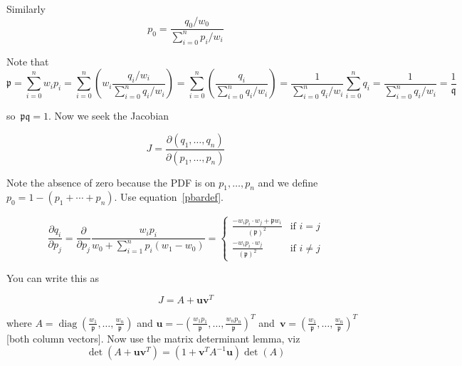 \documentclass[nojss]{jss}
\DeclareMathOperator{\diag}{diag}
\newcommand{\sztn}{\sum_{i=0}^{n}}
\newcommand{\sotn}{\sum_{i=1}^{n}}
\begin{document}
Similarly
\begin{equation}
  p_0=\frac{q_0/w_0}{\sztn p_i/w_i}
  \end{equation}

Note that 
\begin{equation}
  \mathfrak{p} =  \sum_{i=0}^{n}w_ip_i
  =\sum_{i=0}^{n}\left(w_i\frac{q_i/w_i}{\sum_{i=0}^nq_i/w_i}\right)
  =\sum_{i=0}^{n}\left(\frac{q_i}{\sum_{i=0}^nq_i/w_i}\right)
  =\frac{1}{\sum_{i=0}^nq_i/w_i}\sum_{i=0}^{n}q_i
  =\frac{1}{\sum_{i=0}^nq_i/w_i}
  =\frac{1}{\mathfrak q}
  \end{equation}

so~${\mathfrak p}{\mathfrak q}=1$. Now we seek the Jacobian

\begin{equation}
  J =
  \frac{
    \partial\left(q_1,\ldots,q_n\right)
  }{
    \partial\left(p_1,\ldots,p_n\right)
  }
\end{equation}

Note the absence of zero because the PDF is on $p_1,\ldots, p_n$ and
we define $p_0=1-\left(p_1+\cdots+p_n\right)$.  Use equation~\ref{pbardef}.



\begin{equation}
\frac{\partial q_i}{\partial p_j} =
\frac{\partial}{\partial p_j} \frac{w_ip_i}{w_0+\sotn p_i(w_1-w_0)}=
\begin{cases}  \frac{-w_ip_i\cdot w_j + 
  \mathfrak{p} w_i
  }{\displaystyle\left(\mathfrak{p}\right)^2}
  &\mbox{if } i=j \\
\frac{-w_ip_i\cdot w_j}{\displaystyle\left(\mathfrak{p}\right)^2}
  & \mbox{if } i\neq j\end{cases}
\end{equation}

You can write this as 

\begin{equation}
  J = A +  \mathbf{u}\mathbf{v}^T
\end{equation}
  
where
$A=\diag\left(\frac{w_1}{\mathfrak{p}},\ldots,\frac{w_n}{\mathfrak{p}}\right)$
and
$\mathbf{u}=-\left(\frac{w_1p_1}{\mathfrak{p}},\ldots,\frac{w_np_n}{\mathfrak{p}}\right)^T$
and~$\mathbf{v}=\left(\frac{w_1}{\mathfrak{p}},\ldots,\frac{w_n}{\mathfrak{p}}\right)^T$
[both column vectors].  Now use the matrix determinant lemma, viz
\begin{equation}
  \det\left(A+\mathbf{u}\mathbf{v}^T\right)
  = \left(1+\mathbf{v}^TA^{-1}\mathbf{u}\right)\det(A)
\end{equation}
\end{document}

